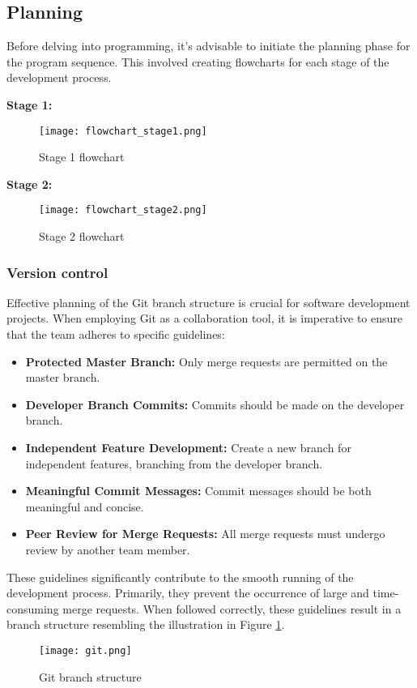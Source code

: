 \documentclass[../report.tex]{subfiles}
\begin{document}
    \subsection{Planning}
    Before delving into programming, it's advisable to initiate the planning
    phase for the program sequence. This involved creating flowcharts for each
    stage of the development process.

    
    \textbf{Stage 1:}
    \begin{figure}[H]
        \centering
        \texttt{[image: flowchart\_stage1.png]}
        \caption{Stage 1 flowchart}
    \end{figure}
    \textbf{Stage 2:}
    \begin{figure}[H]
        \centering
        \texttt{[image: flowchart\_stage2.png]}
        \caption{Stage 2 flowchart}
    \end{figure}

    \subsubsection{Version control}
    Effective planning of the Git branch structure is crucial for software
    development projects. When employing Git as a collaboration tool, it is
    imperative to ensure that the team adheres to specific guidelines:
    \begin{itemize}
        \item \textbf{Protected Master Branch:} Only merge requests are permitted on the master branch.
        \item \textbf{Developer Branch Commits:} Commits should be made on the developer branch.
        \item \textbf{Independent Feature Development:} Create a new branch for independent features, branching from the developer branch.
        \item \textbf{Meaningful Commit Messages:} Commit messages should be both meaningful and concise.
        \item \textbf{Peer Review for Merge Requests:} All merge requests must undergo review by another team member.
    \end{itemize}
    These guidelines significantly contribute to the smooth running of the
    development process. Primarily, they prevent the occurrence of large and
    time-consuming merge requests. When followed correctly, these guidelines
    result in a branch structure resembling the illustration in Figure
    \ref{fig:git}.
    \begin{figure}[H]
        \centering
        \texttt{[image: git.png]}
        \caption{Git branch structure}
        \label{fig:git}
    \end{figure}
\end{document}
